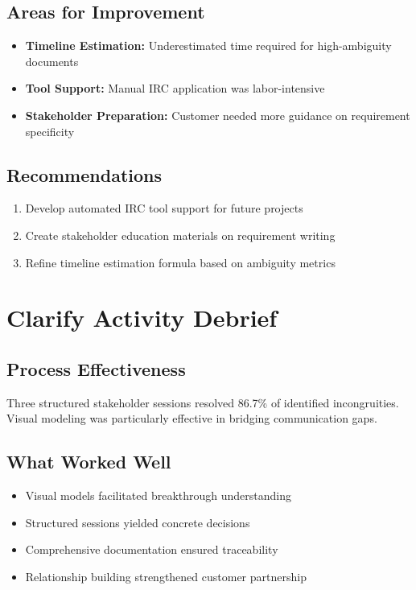 \documentclass[12pt,a4paper]{article}
\begin{document}
\subsection{Areas for Improvement}
\begin{itemize}
    \item \textbf{Timeline Estimation:} Underestimated time required for high-ambiguity documents
    \item \textbf{Tool Support:} Manual IRC application was labor-intensive
    \item \textbf{Stakeholder Preparation:} Customer needed more guidance on requirement specificity
\end{itemize}

\subsection{Recommendations}
\begin{enumerate}
    \item Develop automated IRC tool support for future projects
    \item Create stakeholder education materials on requirement writing
    \item Refine timeline estimation formula based on ambiguity metrics
\end{enumerate}

\section{Clarify Activity Debrief}

\subsection{Process Effectiveness}
Three structured stakeholder sessions resolved 86.7\% of identified incongruities. Visual modeling was particularly effective in bridging communication gaps.

\subsection{What Worked Well}
\begin{itemize}
    \item Visual models facilitated breakthrough understanding
    \item Structured sessions yielded concrete decisions
    \item Comprehensive documentation ensured traceability
    \item Relationship building strengthened customer partnership
\end{itemize}
\end{document}
